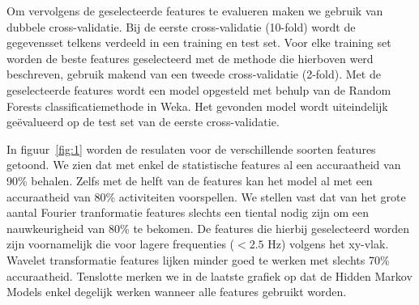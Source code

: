 \documentclass{article}
\begin{document}
Om vervolgens de geselecteerde features te evalueren maken we gebruik van dubbele cross-validatie. Bij de eerste cross-validatie (10-fold) wordt de gegevensset telkens verdeeld in een training en test set. Voor elke training set worden de beste features geselecteerd met de methode die hierboven werd beschreven, gebruik makend van een tweede cross-validatie (2-fold). Met de geselecteerde features wordt een model opgesteld met behulp van de Random Forests classificatiemethode in Weka. Het gevonden model wordt uiteindelijk ge\"evalueerd op de test set van de eerste cross-validatie.
	
In figuur~\ref{fig:1} worden de resulaten voor de verschillende soorten features getoond. We zien dat met enkel de statistische features al een accuraatheid van 90\% behalen. Zelfs met de helft van de features kan het model al met een accuraatheid van 80\% activiteiten voorspellen. We stellen vast dat van het grote aantal Fourier tranformatie features slechts een tiental nodig zijn om een nauwkeurigheid van 80\% te bekomen. De features die hierbij geselecteerd worden zijn voornamelijk die voor lagere frequenties ($<2.5$ Hz) volgens het xy-vlak. Wavelet transformatie features lijken minder goed te werken met slechts 70\% accuraatheid. Tenslotte merken we in de laatste grafiek op dat de Hidden Markov Models enkel degelijk werken wanneer alle features gebruikt worden.
\end{document}
